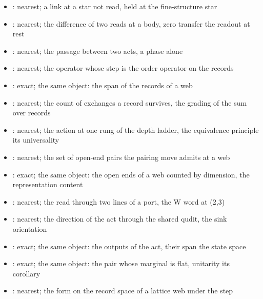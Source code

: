 \begin{chtheorem}
\begin{itemize}
\item {}: nearest; a link at a star not read, held at the fine-structure star
\item {}: nearest; the difference of two reads at a body, zero transfer the readout at rest
\item {}: nearest; the passage between two acts, a phase alone
\item {}: nearest; the operator whose step is the order operator on the records
\item {}: exact; the same object: the span of the records of a web
\item {}: nearest; the count of exchanges a record survives, the grading of the sum over records
\item {}: nearest; the action at one rung of the depth ladder, the equivalence principle its universality
\item {}: nearest; the set of open-end pairs the pairing move admits at a web
\item {}: exact; the same object: the open ends of a web counted by dimension, the representation content
\item {}: nearest; the read through two lines of a port, the W word at (2,3)
\item {}: nearest; the direction of the act through the shared qudit, the sink orientation
\item {}: exact; the same object: the outputs of the act, their span the state space
\item {}: exact; the same object: the pair whose marginal is flat, unitarity its corollary
\item {}: nearest; the form on the record space of a lattice web under the step

\end{itemize}
\end{chtheorem}
